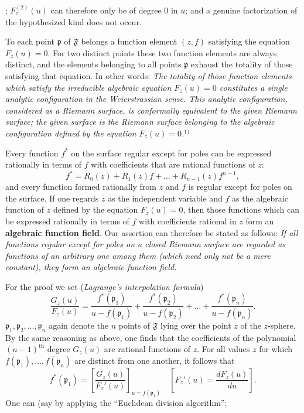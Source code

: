 \documentclass{article}
\begin{document}
; $F_z^{(2)}(u)$ can therefore only be of degree 0 in $u$; and a genuine factorization of the hypothesized kind does not occur.

To each point $\mathfrak{p}$ of $\mathfrak{F}$ belongs a function element $(z, f)$ satisfying the equation $F_z(u) = 0$. For two distinct points these two function elements are always distinct, and the elements belonging to all points $\mathfrak{p}$ exhaust the totality of those satisfying that equation. In other words: \emph{The totality of those function elements which satisfy the irreducible algebraic equation $F_z(u) = 0$ constitutes a single analytic configuration in the Weierstrassian sense. This analytic configuration, considered as a Riemann surface, is conformally equivalent to the given Riemann surface; the given surface is the Riemann surface belonging to the algebraic configuration defined by the equation $F_z(u) = 0$.}${}^{1)}$

Every function $f^*$ on the surface regular except for poles can be expressed rationally in terms of $f$ with coefficients that are rational functions of $z$:
\[ f^* = R_0(z) + R_1(z) f + \dots + R_{n-1}(z) f^{n-1}, \]
and every function formed rationally from $z$ and $f$ is regular except for poles on the surface. If one regards $z$ as the independent variable and $f$ as the algebraic function of $z$ defined by the equation $F_z(u) = 0$, then those functions which can be expressed rationally in terms of $f$ with coefficients rational in $z$ form an \textbf{algebraic function field}. Our assertion can therefore be stated as follows: \emph{If all functions regular except for poles on a closed Riemann surface are regarded as functions of an arbitrary one among them (which need only not be a mere constant), they form an algebraic function field.}

For the proof we set (\emph{Lagrange's interpolation formula})
\[ \frac{G_z(u)}{F_z(u)} = \frac{f^*(\mathfrak{p}_1)}{u - f(\mathfrak{p}_1)} + \frac{f^*(\mathfrak{p}_2)}{u - f(\mathfrak{p}_2)} + \dots + \frac{f^*(\mathfrak{p}_n)}{u - f(\mathfrak{p}_n)}. \]
$\mathfrak{p}_1, \mathfrak{p}_2, \dots, \mathfrak{p}_n$ again denote the $n$ points of $\mathfrak{F}$ lying over the point $z$ of the $z$-sphere. By the same reasoning as above, one finds that the coefficients of the polynomial $(n - 1)^{\text{th}}$ degree $G_z(u)$ are rational functions of $z$. For all values $z$ for which $f(\mathfrak{p}_1), \dots, f(\mathfrak{p}_n)$ are distinct from one another, it follows that
\[ f^*(\mathfrak{p}_1) = \left[ \frac{G_z(u)}{F_z'(u)} \right]_{u = f(\mathfrak{p}_1)} \quad \left[ F_z'(u) = \frac{dF_z(u)}{du} \right]. \]
One can (say by applying the ``Euclidean division algorithm'';
\end{document}
